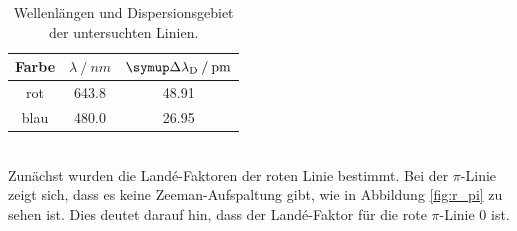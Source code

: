 \begin{table}[h]
  \centering
  \caption{Wellenlängen und Dispersionsgebiet der untersuchten Linien.}
  \label{tab:disp}
  \begin{tabular}{c S[table-format=3.1] S[table-format=2.2]}
    \toprule
    Farbe & {$\lambda\:/\:\si{nm}$} & {$\upD\lambda_\text{D}\:/\:\si{pm}$} \\
    \midrule
    rot  & 643.8 & 48.91 \\
    blau & 480.0   & 26.95 \\
    \bottomrule
  \end{tabular}
\end{table}
%
\ \\
Zunächst wurden die Landé-Faktoren der roten Linie bestimmt. Bei der $\pi$-Linie zeigt sich, dass es keine Zeeman-Aufspaltung gibt, wie in Abbildung \ref{fig:r_pi} zu sehen ist. Dies deutet
darauf hin, dass der Landé-Faktor für die rote $\pi$-Linie 0 ist.
